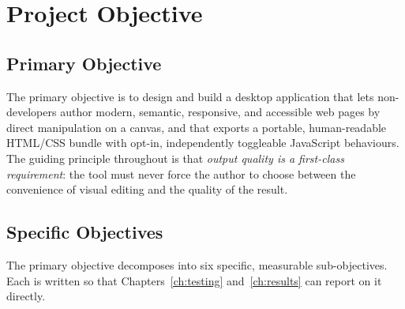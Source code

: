 
\chapter{Project Objective}
\label{ch:objective}

\section{Primary Objective}
The primary objective is to design and build a desktop application that lets
non-developers author modern, semantic, responsive, and accessible web pages by
direct manipulation on a canvas, and that exports a portable, human-readable
HTML/CSS bundle with opt-in, independently toggleable JavaScript behaviours. The
guiding principle throughout is that \emph{output quality is a first-class
requirement}: the tool must never force the author to choose between the
convenience of visual editing and the quality of the result.

\section{Specific Objectives}
The primary objective decomposes into six specific, measurable sub-objectives.
Each is written so that Chapters~\ref{ch:testing} and~\ref{ch:results} can report
on it directly.

